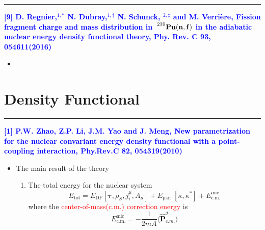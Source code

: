 \vspace{8pt}
\noindent\rule[0.25\baselineskip]{\textwidth}{2pt}
        \noindent \textcolor{blue}{\textbf{[9] D. Regnier,${}^{1,*}$ N. Dubray,${}^{1,\dagger}$ N. Schunck, ${}^{2,\ddagger}$ and M. Verrière, Fission fragment charge and mass distribution in $\sideset{^{239}}{}{\mathop{\mathbf{Pu(n,f)}}}$ in the adiabatic nuclear energy density functional theory, Phy. Rev. C 93, 054611(2016)}}
\begin{itemize}[leftmargin=10pt]
    \item
\end{itemize}
\section{Density Functional}

\noindent\rule[0.25\baselineskip]{\textwidth}{2pt}
\noindent \textcolor{blue}{\textbf{[1] P.W. Zhao, Z.P. Li, J.M. Yao and J. Meng, New parametrization for the nuclear convariant energy density functional with a point-coupling interaction, Phy.Rev.C 82, 054319(2010)}}
\begin{itemize}[leftmargin=10pt]
    \item The main result of the theory
    \begin{enumerate}[leftmargin=10pt]
        \item The total energy for the nuclear system
        \begin{equation}
            E_{\mathrm{tot}}=E_{\mathrm{DF}}\left[\boldsymbol{\tau}, \rho_{S}, j_{i}^{\mu}, A_{\mu}\right]+ E_{\text {pair }}\left[\kappa, \kappa^{*}\right] + E_{\mathrm{c} . \mathrm{m} .}^{\mathrm{mic}}
        \end{equation}
        where the \textcolor{red}{center-of-mass(c.m.) correction energy } is
        \begin{equation}
            E_{\mathrm{c} . \mathrm{m} .}^{\mathrm{mic}} = -\frac{1}{2mA}\langle \hat{\boldsymbol{P}}^2_{c.m.} \rangle
        \end{equation}

    \end{enumerate}
\end{itemize}